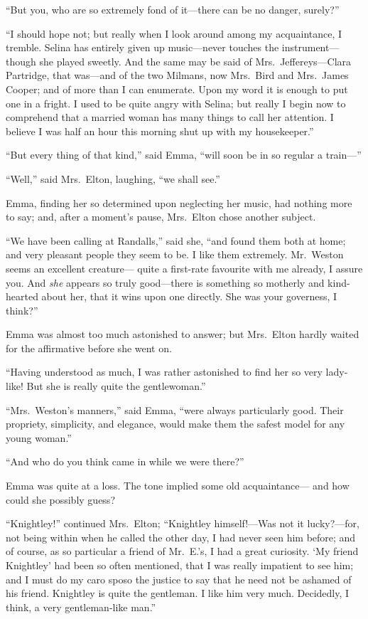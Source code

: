 ``But you, who are so extremely fond of it---there can
be no danger, surely?''

``I should hope not; but really when I look around among my acquaintance,
I tremble.  Selina has entirely given up music---never touches
the instrument---though she played sweetly.  And the same may be said
of Mrs.\ Jeffereys---Clara Partridge, that was---and of the two Milmans,
now Mrs.\ Bird and Mrs.\ James Cooper; and of more than I can enumerate.
Upon my word it is enough to put one in a fright.  I used to be
quite angry with Selina; but really I begin now to comprehend
that a married woman has many things to call her attention.
I believe I was half an hour this morning shut up with my housekeeper.''

``But every thing of that kind,'' said Emma, ``will soon
be in so regular a train---''

``Well,'' said Mrs.\ Elton, laughing, ``we shall see.''

Emma, finding her so determined upon neglecting her music,
had nothing more to say; and, after a moment's pause, Mrs.\ Elton
chose another subject.

``We have been calling at Randalls,'' said she, ``and found them
both at home; and very pleasant people they seem to be.
I like them extremely.  Mr.\ Weston seems an excellent creature---%
quite a first-rate favourite with me already, I assure you.
And \emph{she} appears so truly good---there is something so motherly
and kind-hearted about her, that it wins upon one directly.
She was your governess, I think?''

Emma was almost too much astonished to answer; but Mrs.\ Elton
hardly waited for the affirmative before she went on.

``Having understood as much, I was rather astonished to find her
so very lady-like!  But she is really quite the gentlewoman.''

``Mrs.\ Weston's manners,'' said Emma, ``were always particularly good.
Their propriety, simplicity, and elegance, would make them the safest
model for any young woman.''

``And who do you think came in while we were there?''

Emma was quite at a loss.  The tone implied some old acquaintance---%
and how could she possibly guess?

``Knightley!'' continued Mrs.\ Elton; ``Knightley himself!---Was not
it lucky?---for, not being within when he called the other day,
I had never seen him before; and of course, as so particular a
friend of Mr.\ E.'s, I had a great curiosity.  `My friend Knightley'
had been so often mentioned, that I was really impatient to see him;
and I must do my caro sposo the justice to say that he need not
be ashamed of his friend.  Knightley is quite the gentleman.
I like him very much.  Decidedly, I think, a very gentleman-like man.''

